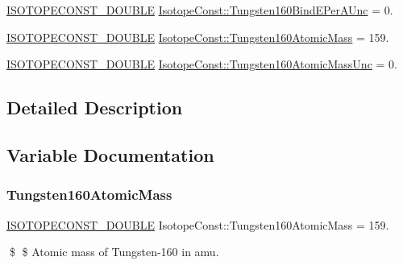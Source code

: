 \begin{DoxyCompactItemize}
\mbox{\hyperlink{group___isotope_const-_macros_ga8f45a7272ce02c0b4c65c44636ed719a}{I\+S\+O\+T\+O\+P\+E\+C\+O\+N\+S\+T\+\_\+\+D\+O\+U\+B\+LE}} \mbox{\hyperlink{group___isotope_const-_tungsten-_w160_gaad5dd6aa4fbbb435c433a32eb8217ba5}{Isotope\+Const\+::\+Tungsten160\+Bind\+E\+Per\+A\+Unc}} = 0.
\item 
\mbox{\hyperlink{group___isotope_const-_macros_ga8f45a7272ce02c0b4c65c44636ed719a}{I\+S\+O\+T\+O\+P\+E\+C\+O\+N\+S\+T\+\_\+\+D\+O\+U\+B\+LE}} \mbox{\hyperlink{group___isotope_const-_tungsten-_w160_ga18d9347c1975e20ba2a0327f16d82ac7}{Isotope\+Const\+::\+Tungsten160\+Atomic\+Mass}} = 159.
\item 
\mbox{\hyperlink{group___isotope_const-_macros_ga8f45a7272ce02c0b4c65c44636ed719a}{I\+S\+O\+T\+O\+P\+E\+C\+O\+N\+S\+T\+\_\+\+D\+O\+U\+B\+LE}} \mbox{\hyperlink{group___isotope_const-_tungsten-_w160_ga511925998b9591f41a6a3e672658d5ea}{Isotope\+Const\+::\+Tungsten160\+Atomic\+Mass\+Unc}} = 0.
\end{DoxyCompactItemize}


\subsection{Detailed Description}


\subsection{Variable Documentation}
\mbox{\label{group___isotope_const-_tungsten-_w160_ga18d9347c1975e20ba2a0327f16d82ac7}} 
\subsubsection{\texorpdfstring{Tungsten160\+Atomic\+Mass}{Tungsten160AtomicMass}}
{\footnotesize\ttfamily \mbox{\hyperlink{group___isotope_const-_macros_ga8f45a7272ce02c0b4c65c44636ed719a}{I\+S\+O\+T\+O\+P\+E\+C\+O\+N\+S\+T\+\_\+\+D\+O\+U\+B\+LE}} Isotope\+Const\+::\+Tungsten160\+Atomic\+Mass = 159.}

\$ \$ Atomic mass of Tungsten-\/160 in amu. \mbox{\label{group___isotope_const-_tungsten-_w160_ga511925998b9591f41a6a3e672658d5ea}} 
